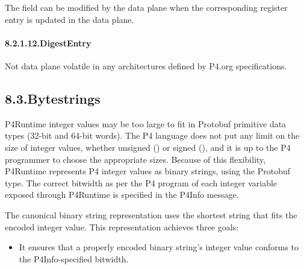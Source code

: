 \documentclass[11pt]{article}
\begin{document}
{%
\noindent{}The field  can be modified by the data plane when the
corresponding register entry is updated in the data plane.%

\paragraph{8.2.1.12.\hspace*{0.5em}DigestEntry}\label{sec-digestentry}%

\noindent{}Not data plane volatile in any architectures defined by P4.org
specifications.%

\subsection{8.3.\hspace*{0.5em}Bytestrings}\label{sec-bytestrings}%

\noindent{}P4Runtime integer values may be too large to fit in Protobuf primitive data
types (32-bit and 64-bit words). The P4 language does not put any limit on the
size of integer values, whether unsigned () or signed (), and it
is up to the P4 programmer to choose the appropriate sizes. Because of this
flexibility, P4Runtime represents P4 integer values as binary strings, using the
 Protobuf type. The correct bitwidth \textemdash{} as per the P4 program \textemdash{} of
each integer variable exposed through P4Runtime is specified in the P4Info
message.%

The canonical binary string representation uses the shortest string that
fits the encoded integer value. This representation achieves three goals:%

\begin{itemize}%

\item{}
It ensures that a properly encoded binary string's integer value conforms
to the P4Info-specified bitwidth.%


\end{itemize}}
\end{document}
